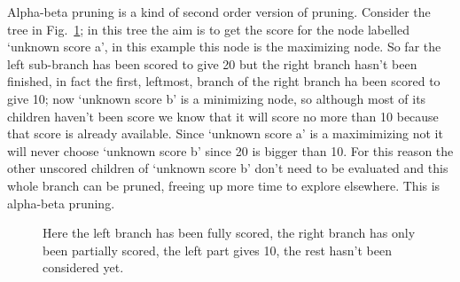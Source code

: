 \documentclass[11pt,a4paper]{scrartcl}
\begin{document}
Alpha-beta pruning is a kind of second order version of
pruning. Consider the tree in Fig.~\ref{fig:partial}; in this tree the
aim is to get the score for the node labelled \lq{}unknown score
a\rq{}, in this example this node is the maximizing node. So far the
left sub-branch has been scored to give 20 but the right branch hasn't
been finished, in fact the first, leftmost, branch of the right branch
ha been scored to give 10; now \lq{}unknown score b\rq{} is a
minimizing node, so although most of its children haven't been score
we know that it will score no more than 10 because that score is
already available. Since \lq{}unknown score a\rq{} is a maximimizing
not it will never choose \lq{}unknown score b\rq{} since 20 is bigger
than 10. For this reason the other unscored children of \lq{}unknown
score b\rq{} don't need to be evaluated and this whole branch can be
pruned, freeing up more time to explore elsewhere. This is alpha-beta
pruning.

\begin{figure}
\begin{center}
\end{center}
\caption{Here the left branch has been fully scored, the right branch has only been partially scored, the left part gives 10, the rest hasn't been considered yet.\label{fig:partial}}
\end{figure}
\end{document}
